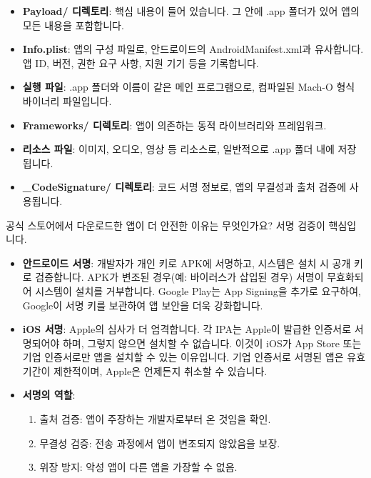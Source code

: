 \begin{itemize}
  \item \textbf{Payload/ 디렉토리}: 핵심 내용이 들어 있습니다. 그 안에 .app 폴더가 있어 앱의 모든 내용을 포함합니다.
  \item \textbf{Info.plist}: 앱의 구성 파일로, 안드로이드의 AndroidManifest.xml과 유사합니다. 앱 ID, 버전, 권한 요구 사항, 지원 기기 등을 기록합니다.
  \item \textbf{실행 파일}: .app 폴더와 이름이 같은 메인 프로그램으로, 컴파일된 Mach-O 형식 바이너리 파일입니다.
  \item \textbf{Frameworks/ 디렉토리}: 앱이 의존하는 동적 라이브러리와 프레임워크.
  \item \textbf{리소스 파일}: 이미지, 오디오, 영상 등 리소스로, 일반적으로 .app 폴더 내에 저장됩니다.
  \item \textbf{\_CodeSignature/ 디렉토리}: 코드 서명 정보로, 앱의 무결성과 출처 검증에 사용됩니다.
\end{itemize}


공식 스토어에서 다운로드한 앱이 더 안전한 이유는 무엇인가요? 서명 검증이 핵심입니다.

\begin{itemize}
  \item \textbf{안드로이드 서명}: 개발자가 개인 키로 APK에 서명하고, 시스템은 설치 시 공개 키로 검증합니다. APK가 변조된 경우(예: 바이러스가 삽입된 경우) 서명이 무효화되어 시스템이 설치를 거부합니다. Google Play는 App Signing을 추가로 요구하여, Google이 서명 키를 보관하여 앱 보안을 더욱 강화합니다.
  \item \textbf{iOS 서명}: Apple의 심사가 더 엄격합니다. 각 IPA는 Apple이 발급한 인증서로 서명되어야 하며, 그렇지 않으면 설치할 수 없습니다. 이것이 iOS가 App Store 또는 기업 인증서로만 앱을 설치할 수 있는 이유입니다. 기업 인증서로 서명된 앱은 유효 기간이 제한적이며, Apple은 언제든지 취소할 수 있습니다.
  \item \textbf{서명의 역할}:
  \begin{enumerate}
    \item 출처 검증: 앱이 주장하는 개발자로부터 온 것임을 확인.
    \item 무결성 검증: 전송 과정에서 앱이 변조되지 않았음을 보장.
    \item 위장 방지: 악성 앱이 다른 앱을 가장할 수 없음.
  \end{enumerate}
\end{itemize}


